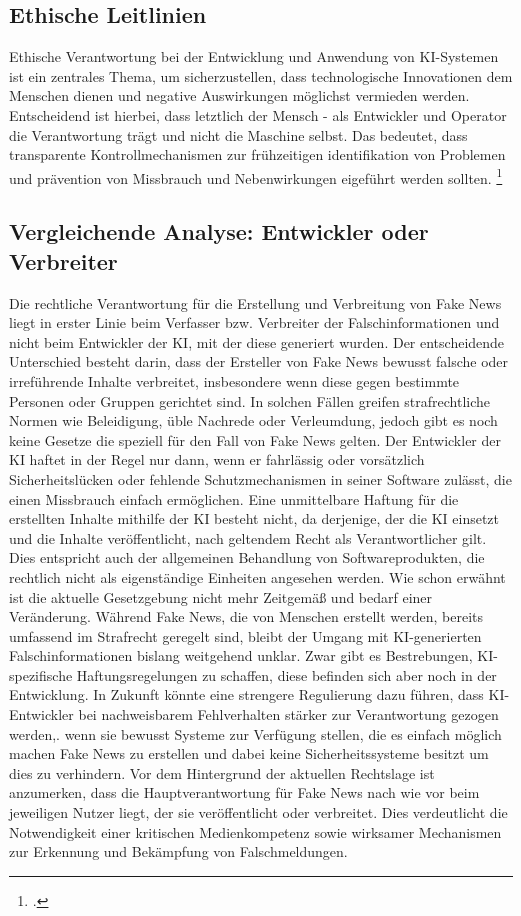 \documentclass[Thesis.tex]{subfiles}
\begin{document}
\subsection{Ethische Leitlinien}
Ethische Verantwortung bei der Entwicklung und Anwendung von \ac{KI}-Systemen ist ein zentrales Thema,
um sicherzustellen, dass technologische Innovationen dem Menschen dienen und negative Auswirkungen 
möglichst vermieden werden. Entscheidend ist hierbei, dass letztlich der Mensch - als Entwickler und 
Operator die Verantwortung trägt und nicht die Maschine selbst. Das bedeutet, dass transparente 
Kontrollmechanismen zur frühzeitigen identifikation von Problemen und prävention von Missbrauch 
und Nebenwirkungen eigeführt werden sollten. \footcite{EthikLeitlinien2018}

\subsection{Vergleichende Analyse: Entwickler oder Verbreiter}
Die rechtliche Verantwortung für die Erstellung und Verbreitung von Fake News liegt in erster Linie
beim Verfasser bzw. Verbreiter der Falschinformationen und nicht beim Entwickler der \ac{KI}, mit der diese
generiert wurden. Der entscheidende Unterschied besteht darin, dass der Ersteller von Fake News bewusst
falsche oder irreführende Inhalte verbreitet, insbesondere wenn diese gegen bestimmte Personen 
oder Gruppen gerichtet sind. In solchen Fällen greifen strafrechtliche Normen wie Beleidigung,
üble Nachrede oder Verleumdung, jedoch gibt es noch keine Gesetze die speziell für den Fall von
Fake News gelten.
Der Entwickler der \ac{KI} haftet in der Regel nur dann, wenn er fahrlässig oder vorsätzlich Sicherheitslücken
oder fehlende Schutzmechanismen in seiner Software zulässt, die einen Missbrauch einfach ermöglichen.
Eine unmittelbare Haftung für die erstellten Inhalte mithilfe der \ac{KI} besteht nicht, da derjenige, der 
die \ac{KI} einsetzt und die Inhalte veröffentlicht, nach geltendem Recht als Verantwortlicher gilt. Dies entspricht
auch der allgemeinen Behandlung von Softwareprodukten, die rechtlich nicht als eigenständige Einheiten angesehen werden.
Wie schon erwähnt ist die aktuelle Gesetzgebung nicht mehr Zeitgemäß und bedarf einer Veränderung. Während
Fake News, die von Menschen erstellt werden, bereits umfassend im Strafrecht geregelt sind, bleibt der Umgang
mit \ac{KI}-generierten Falschinformationen bislang weitgehend unklar. Zwar gibt es Bestrebungen, \ac{KI}-spezifische
Haftungsregelungen zu schaffen, diese befinden sich aber noch in der Entwicklung. In Zukunft könnte eine 
strengere Regulierung dazu führen, dass \ac{KI}-Entwickler bei nachweisbarem Fehlverhalten stärker zur 
Verantwortung gezogen werden,. wenn sie bewusst Systeme zur Verfügung stellen, die es einfach möglich
machen Fake News zu erstellen und dabei keine Sicherheitssysteme besitzt um dies zu verhindern.
Vor dem Hintergrund der aktuellen Rechtslage ist anzumerken, dass die Hauptverantwortung für Fake News nach
wie vor beim jeweiligen Nutzer liegt, der sie veröffentlicht oder verbreitet. Dies verdeutlicht die Notwendigkeit 
einer kritischen Medienkompetenz sowie wirksamer Mechanismen zur Erkennung und Bekämpfung von Falschmeldungen.
\end{document}
